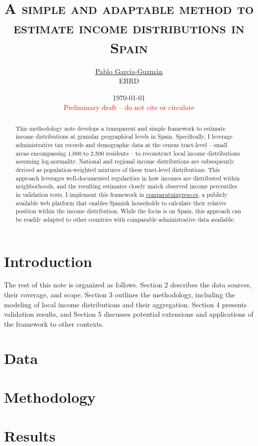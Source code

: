 \documentclass[letterpaper,11pt,leqno]{article}
\begin{document}
\title{\Large \textsc{A simple and adaptable method to estimate income distributions in Spain}}

\author{\href{https://pablogguz.github.io/}{\large{Pablo García-Guzmán}} \\ \normalsize{EBRD}}

\date{\normalsize \today \\ \textcolor{red}{Preliminary draft -- do not cite or circulate}}

\maketitle
\begin{abstract}
\onehalfspacing
This methodology note develops a transparent and simple framework to estimate income distributions at granular geographical levels in Spain. Specifically, I leverage administrative tax records and demographic data at the census tract-level -- small areas encompassing 1,000 to 2,500 residents -- to reconstruct local income distributions assuming log-normality. National and regional income distributions are subsequently derived as population-weighted mixtures of these tract-level distributions. This approach leverages well-documented regularities in how incomes are distributed within neighborhoods, and the resulting estimates closely match observed income percentiles in validation tests. I implement this framework in \href{https://comparatuingreso.es/}{comparatuingreso.es}, a publicly available web platform that enables Spanish households to calculate their relative position within the income distribution. While the focus is on Spain, this approach can be readily adapted to other countries with comparable administrative data available.
\end{abstract}

\thispagestyle{empty}

\newpage

\setcounter{page}{1}

\section{Introduction}

The rest of this note is organized as follows. Section 2 describes the data sources, their coverage, and scope. Section 3 outlines the methodology, including the modeling of local income distributions and their aggregation. Section 4 presents validation results, and Section 5 discusses potential extensions and applications of the framework to other contexts.

\section{Data}



\section{Methodology}



\section{Results}



\newpage
\singlespacing


\end{document}
